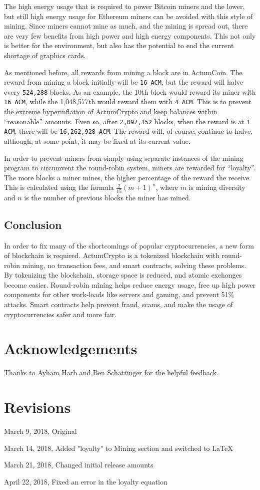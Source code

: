 \documentclass[letter]{article}
\begin{document}
The high energy usage that is required to power Bitcoin miners and the lower, but still high energy usage for Ethereum miners can be avoided with this style of mining. Since miners cannot mine as much, and the mining is spread out, there are very few benefits from high power and high energy components. This not only is better for the environment, but also has the potential to end the current shortage of graphics cards.

As mentioned before, all rewards from mining a block are in ActumCoin. The reward from mining a block initially will be \texttt{16 ACM}, but the reward will halve every \texttt{524,288} blocks. As an example, the 10th block would reward its miner with \texttt{16 ACM}, while the 1,048,577th would reward them with \texttt{4 ACM}. This is to prevent the extreme hyperinflation of ActumCrypto and keep balances within “reasonable” amounts. Even so, after \texttt{2,097,152} blocks, when the reward is at \texttt{1 ACM}, there will be \texttt{16,262,928 ACM}. The reward will, of course, continue to halve, although, at some point, it may be fixed at its current value.

In order to prevent miners from simply using separate instances of the mining program to circumvent the round-robin system, miners are rewarded for “loyalty”. The more blocks a miner mines, the higher percentage of the reward the receive. This is calculated using the formula $\frac{2}{15}(m+1)^{n}$, where $m$ is mining diversity and $n$ is the number of previous blocks the miner has mined. 
\subsection{Conclusion}
In order to fix many of the shortcomings of popular cryptocurrencies, a new form of blockchain is required. ActumCrypto is a tokenized blockchain with round-robin mining, no transaction fees, and smart contracts, solving these problems. By tokenizing the blockchain, storage space is reduced, and atomic exchanges become easier. Round-robin mining helps reduce energy usage, free up high power components for other work-loads like servers and gaming, and prevent 51\% attacks. Smart contracts help prevent fraud, scams, and make the usage of cryptocurrencies safer and more fair.
\pagebreak

\section{Acknowledgements}
Thanks to Ayham Harb and Ben Schattinger for the helpful feedback.

\section{Revisions}
March 9, 2018, Original

March 14, 2018, Added "loyalty" to Mining section and switched to LaTeX

March 21, 2018, Changed initial release amounts

April 22, 2018, Fixed an error in the loyalty equation

\newpage
\printbibliography
\end{document}
